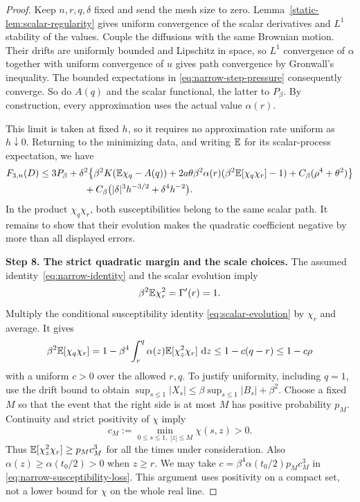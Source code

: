 \begin{proof}
Keep $n,r,q,\delta$ fixed and send the mesh size to zero.
Lemma~\ref{static-lem:scalar-regularity} gives uniform convergence
of the scalar derivatives and $L^1$ stability of the values. Couple
the diffusions with the same Brownian motion. Their drifts are
uniformly bounded and Lipschitz in space, so $L^1$ convergence of
$\alpha$ together with uniform convergence of $u$ gives path
convergence by Gronwall's inequality. The bounded expectations in
\eqref{eq:narrow-step-pressure} consequently converge. So do $A(q)$
and the scalar functional, the latter to $P_\beta$. By construction,
every approximation uses the actual value $\alpha(r)$.

This limit is taken at fixed $h$, so it requires no approximation
rate uniform as $h\downarrow0$. Returning to the minimizing data,
and writing $\mathbb E$ for its scalar-process expectation, we have
\begin{align}
 F_{3,n}(D)\le 3P_\beta
 +\delta^2\bigl\{&
   \beta^2K(\mathbb E\chi_q-A(q))
   +2a\theta\beta^2\alpha(r)
                    (\beta^2\mathbb E[\chi_q\chi_r]-1)
   +C_\beta(\rho^4+\theta^2)\bigr\}
 \notag\\
 &\hspace{-1em}
   +C_\beta\bigl(|\delta|^3h^{-3/2}+\delta^4h^{-2}\bigr).
 \label{eq:narrow-pressure}
\end{align}
In the product $\chi_q\chi_r$, both susceptibilities belong to the
same scalar path. It remains to show that their evolution makes
the quadratic coefficient negative by more than all displayed
errors.

\par\medskip\noindent\textbf{Step 8. The strict quadratic margin and the scale choices.}\enspace
The assumed identity~\eqref{eq:narrow-identity} and the scalar
evolution imply
\[
 \beta^2\mathbb E\chi_r^2=\Gamma'(r)=1.
\]
Multiply the conditional susceptibility identity
\eqref{eq:scalar-evolution} by $\chi_r$ and average. It gives
\begin{equation}\label{eq:narrow-susceptibility-loss}
 \beta^2\mathbb E[\chi_q\chi_r]
 =1-\beta^4\int_r^q\alpha(z)\mathbb E[\chi_z^2\chi_r]\,\,\mathrm d z
 \le1-c(q-r)\le1-c\rho
\end{equation}
with a uniform $c>0$ over the allowed $r,q$. To justify uniformity,
including $q=1$, use the drift bound to obtain
$\sup_{s\le1}|X_s|\le\beta\sup_{s\le1}|B_s|+\beta^2$.
Choose a fixed $M$ so that the event that the right side is at most
$M$ has positive probability $p_M$. Continuity and strict positivity
of $\chi$ imply
\[
 c_M:=\min_{0\le s\le1,\ |z|\le M}\chi(s,z)>0.
\]
Thus $\mathbb E[\chi_z^2\chi_r]\ge p_Mc_M^3$ for all the times under
consideration. Also $\alpha(z)\ge\alpha(t_0/2)>0$ when $z\ge r$.
We may take $c=\beta^4\alpha(t_0/2)p_Mc_M^3$ in
\eqref{eq:narrow-susceptibility-loss}. This argument uses positivity
on a compact set, not a lower bound for $\chi$ on the whole real
line.


\end{proof}
